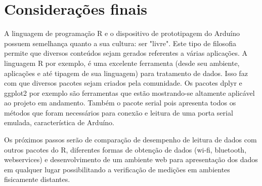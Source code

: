 \section*{Considerações finais}

A linguagem de programação R e o dispositivo de prototipagem do Arduíno possuem semelhança quanto a sua cultura: ser "livre". 
Este tipo de filosofia permite que diversos conteúdos sejam gerados referentes a várias aplicações. A linguagem R por exemplo, é uma excelente ferramenta (desde seu ambiente, aplicações e até tipagem de sua linguagem) para tratamento de dados. Isso faz com que diversos pacotes sejam criados pela comunidade. Os pacotes dplyr e ggplot2 por exemplo são ferramentas que estão mostrando-se altamente aplicável ao projeto em andamento. Também o pacote serial pois apresenta todos os métodos que foram necessários para conexão e leitura de uma porta serial emulada, característica de Arduíno.

Os próximos passos serão de comparação de desempenho de leitura de dados com outros pacotes do R, diferentes formas de obtenção de dados (wi-fi, bluetooth, webservices) e desenvolvimento de um ambiente web para apresentação dos dados em qualquer lugar possibilitando a verificação de medições em ambientes fisicamente distantes.
